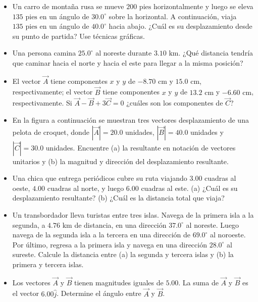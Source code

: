 \documentclass[11pt,a4paper]{article}
\begin{document}
\newpage

\begin{itemize}
    \item[\textbf{17.}] Un carro de montaña rusa se mueve $200 \text{ pies}$ horizontalmente y luego se eleva $135 \text{ pies}$ en un ángulo de $30.0^\circ$ sobre la horizontal. A continuación, viaja $135 \text{ pies}$ en un ángulo de $40.0^\circ$ hacia abajo. ¿Cuál es su desplazamiento desde su punto de partida? Use técnicas gráficas.
    \vspace*{8cm}

    \item[\textbf{18.}] Una persona camina $25.0^\circ$ al noreste durante $3.10 \text{ km}$. ¿Qué distancia tendría que caminar hacia el norte y hacia el este para llegar a la misma posición?
    \vspace*{6cm}

    \item[\textbf{19.}] El vector $\vec{A}$ tiene componentes $x$ y $y$ de $-8.70 \text{ cm}$ y $15.0 \text{ cm}$, respectivamente; el vector $\vec{B}$ tiene componentes $x$ y $y$ de $13.2 \text{ cm}$ y $-6.60 \text{ cm}$, respectivamente. Si $\vec{A} - \vec{B} + 3\vec{C} = 0$ ¿cuáles son los componentes de $\vec{C}$?
    \vspace*{6cm}

    \item[\textbf{20.}] En la figura a continuación se muestran tres vectores desplazamiento de una pelota de croquet, donde $|\vec{A}| = 20.0$ unidades, $|\vec{B}| = 40.0$ unidades y $|\vec{C}| = 30.0$ unidades. Encuentre (a) la resultante en notación de vectores unitarios y (b) la magnitud y dirección del desplazamiento resultante.
    \vspace*{6cm}
\end{itemize}

\newpage

\begin{itemize}
    \item[\textbf{21.}] Una chica que entrega periódicos cubre su ruta viajando $3.00$ cuadras al oeste, $4.00$ cuadras al norte, y luego $6.00$ cuadras al este. (a) ¿Cuál es su desplazamiento resultante? (b) ¿Cuál es la distancia total que viaja?
    \vspace*{6cm}

    \item[\textbf{22.}] Un transbordador lleva turistas entre tres islas. Navega de la primera isla a la segunda, a $4.76 \text{ km}$ de distancia, en una dirección $37.0^\circ$ al noreste. Luego navega de la segunda isla a la tercera en una dirección de $69.0^\circ$ al noroeste. Por último, regresa a la primera isla y navega en una dirección $28.0^\circ$ al sureste. Calcule la distancia entre (a) la segunda y tercera islas y (b) la primera y tercera islas.
    \vspace*{6cm}

    \item[\textbf{23.}] Los vectores $\vec{A}$ y $\vec{B}$ tienen magnitudes iguales de $5.00$. La suma de $\vec{A}$ y $\vec{B}$ es el vector $6.00\hat{j}$. Determine el ángulo entre $\vec{A}$ y $\vec{B}$.
    \vspace*{6cm}
\end{itemize}
\end{document}
